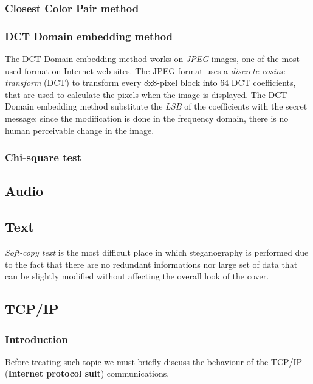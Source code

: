 \documentclass[../../main.tex]{subfiles}
\begin{document}
    \subsubsection{Closest Color Pair method}


    \subsubsection{DCT Domain embedding method}
    The DCT Domain embedding method works on \emph{JPEG} images, one of the most
    used format on Internet web sites.
    The JPEG format uses a \emph{discrete cosine transform} (DCT) to transform
    every 8x8-pixel block into 64 DCT coefficients, that are used to calculate
    the pixels when the image is displayed.
    The DCT Domain embedding method substitute the \emph{LSB} of the
    coefficients with the secret message: since the modification is done in the
    frequency domain, there is no human perceivable change in the image.


    \subsubsection{Chi-square test}

    

    \subsection{Audio}
    
    
    \subsection{Text}
    \emph{Soft-copy text} is the most difficult place in which steganography is
    performed due to the fact that there are no redundant informations nor large
    set of data that can be slightly modified without affecting the overall look
    of the cover.


    
    

    \subsection{TCP/IP}
    \subsubsection{Introduction}
    Before treating such topic we must briefly discuss the behaviour of the
    TCP/IP (\textbf{Internet protocol suit}) communications.
    
\end{document}
